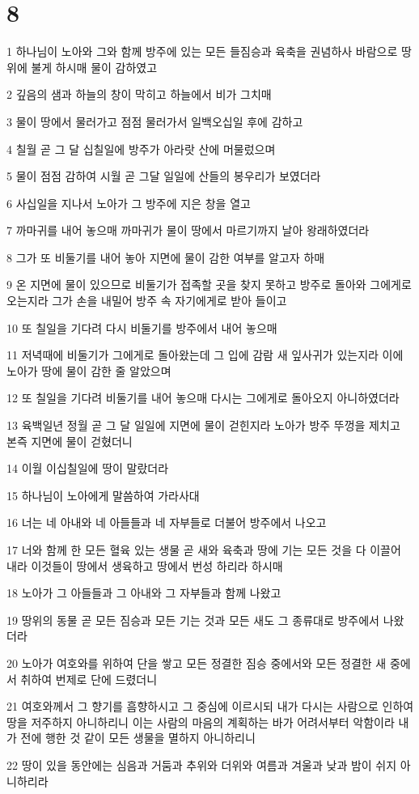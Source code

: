 \chapter{8}

\par 1 하나님이 노아와 그와 함께 방주에 있는 모든 들짐승과 육축을 권념하사 바람으로 땅 위에 불게 하시매 물이 감하였고
\par 2 깊음의 샘과 하늘의 창이 막히고 하늘에서 비가 그치매
\par 3 물이 땅에서 물러가고 점점 물러가서 일백오십일 후에 감하고
\par 4 칠월 곧 그 달 십칠일에 방주가 아라랏 산에 머물렀으며
\par 5 물이 점점 감하여 시월 곧 그달 일일에 산들의 봉우리가 보였더라
\par 6 사십일을 지나서 노아가 그 방주에 지은 창을 열고
\par 7 까마귀를 내어 놓으매 까마귀가 물이 땅에서 마르기까지 날아 왕래하였더라
\par 8 그가 또 비둘기를 내어 놓아 지면에 물이 감한 여부를 알고자 하매
\par 9 온 지면에 물이 있으므로 비둘기가 접족할 곳을 찾지 못하고 방주로 돌아와 그에게로 오는지라 그가 손을 내밀어 방주 속 자기에게로 받아 들이고
\par 10 또 칠일을 기다려 다시 비둘기를 방주에서 내어 놓으매
\par 11 저녁때에 비둘기가 그에게로 돌아왔는데 그 입에 감람 새 잎사귀가 있는지라 이에 노아가 땅에 물이 감한 줄 알았으며
\par 12 또 칠일을 기다려 비둘기를 내어 놓으매 다시는 그에게로 돌아오지 아니하였더라
\par 13 육백일년 정월 곧 그 달 일일에 지면에 물이 걷힌지라 노아가 방주 뚜껑을 제치고 본즉 지면에 물이 걷혔더니
\par 14 이월 이십칠일에 땅이 말랐더라
\par 15 하나님이 노아에게 말씀하여 가라사대
\par 16 너는 네 아내와 네 아들들과 네 자부들로 더불어 방주에서 나오고
\par 17 너와 함께 한 모든 혈육 있는 생물 곧 새와 육축과 땅에 기는 모든 것을 다 이끌어 내라 이것들이 땅에서 생육하고 땅에서 번성 하리라 하시매
\par 18 노아가 그 아들들과 그 아내와 그 자부들과 함께 나왔고
\par 19 땅위의 동물 곧 모든 짐승과 모든 기는 것과 모든 새도 그 종류대로 방주에서 나왔더라
\par 20 노아가 여호와를 위하여 단을 쌓고 모든 정결한 짐승 중에서와 모든 정결한 새 중에서 취하여 번제로 단에 드렸더니
\par 21 여호와께서 그 향기를 흠향하시고 그 중심에 이르시되 내가 다시는 사람으로 인하여 땅을 저주하지 아니하리니 이는 사람의 마음의 계획하는 바가 어려서부터 악함이라 내가 전에 행한 것 같이 모든 생물을 멸하지 아니하리니
\par 22 땅이 있을 동안에는 심음과 거둠과 추위와 더위와 여름과 겨울과 낮과 밤이 쉬지 아니하리라

